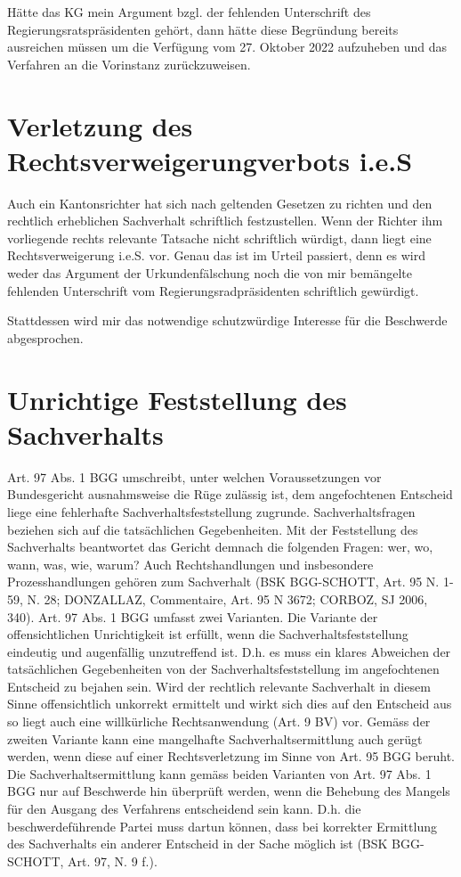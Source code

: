 \documentclass[paper=a4, onesite]{scrreprt}
\newcounter{rz}
\newcommand{\Rz}{\addtocounter{rz}{1}\marginpar{\texttt{(\textit{\arabic{rz}})}}}
\begin{document}
\Rz Hätte das \ac{KG} mein Argument bzgl. der fehlenden Unterschrift des Regierungsratspräsidenten gehört, dann hätte diese Begründung bereits ausreichen müssen um die Verfügung vom 27. Oktober 2022 aufzuheben und das Verfahren an die Vorinstanz zurückzuweisen. 

\section{Verletzung des Rechtsverweigerungverbots i.e.S}
\Rz Auch ein Kantonsrichter hat sich nach geltenden Gesetzen zu richten und den rechtlich erheblichen Sachverhalt schriftlich festzustellen. Wenn der Richter ihm vorliegende rechts relevante Tatsache nicht schriftlich würdigt, dann liegt eine Rechtsverweigerung i.e.S. vor. Genau das ist im Urteil passiert, denn es wird weder das Argument der Urkundenfälschung noch die von mir bemängelte fehlenden Unterschrift vom Regierungsradpräsidenten schriftlich gewürdigt. 

Stattdessen wird mir das notwendige schutzwürdige Interesse für die Beschwerde abgesprochen.



\section{Unrichtige Feststellung des Sachverhalts}
\Rz Art. 97 Abs. 1 BGG umschreibt, unter welchen Voraussetzungen vor Bundesgericht ausnahmsweise die Rüge zulässig ist, dem angefochtenen Entscheid liege eine fehlerhafte Sachverhaltsfeststellung zugrunde. Sachverhaltsfragen beziehen sich auf die tatsächlichen Gegebenheiten. Mit der Feststellung des Sachverhalts beantwortet das Gericht demnach die folgenden Fragen: wer, wo,
wann, was, wie, warum? Auch Rechtshandlungen und insbesondere Prozesshandlungen gehören zum Sachverhalt (BSK BGG-SCHOTT, Art. 95 N. 1-59, N. 28; DONZALLAZ, Commentaire, Art. 95 N 3672; CORBOZ, SJ 2006, 340). Art. 97 Abs. 1 BGG umfasst zwei Varianten. Die Variante der offensichtlichen Unrichtigkeit ist erfüllt, wenn die Sachverhaltsfeststellung eindeutig und augenfällig unzutreffend ist. D.h. es muss ein klares Abweichen der tatsächlichen Gegebenheiten von der Sachverhaltsfeststellung im angefochtenen Entscheid zu bejahen sein. Wird der rechtlich relevante Sachverhalt in diesem Sinne offensichtlich unkorrekt ermittelt und wirkt sich dies auf den Entscheid aus so liegt auch eine willkürliche Rechtsanwendung (Art. 9 BV) vor. Gemäss der zweiten Variante kann eine mangelhafte Sachverhaltsermittlung auch gerügt werden, wenn diese auf einer Rechtsverletzung im Sinne von Art. 95 BGG beruht. Die Sachverhaltsermittlung kann gemäss beiden Varianten von Art. 97 Abs. 1 BGG nur auf Beschwerde hin überprüft werden, wenn die Behebung des Mangels für den Ausgang des Verfahrens entscheidend sein kann. D.h. die beschwerdeführende Partei muss dartun können, dass bei korrekter Ermittlung des Sachverhalts ein anderer Entscheid in der Sache möglich ist (BSK BGG-SCHOTT, Art. 97, N. 9 f.).
\end{document}

